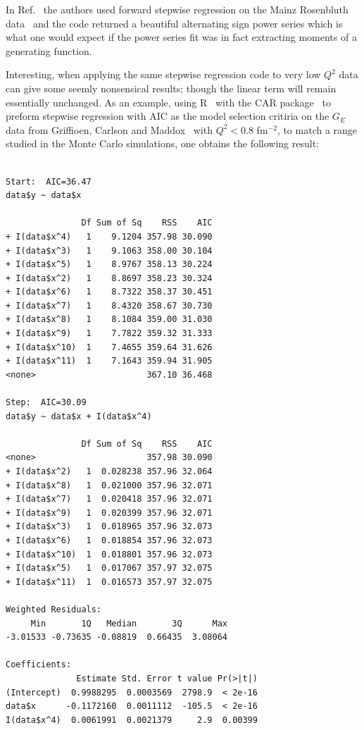 \documentclass[10pt,aps,prc,twocolumn]{revtex4-1}
\begin{document}
\begin{appendix}
In Ref.~\cite{Higinbotham:2015rja} the authors used forward stepwise regression on the Mainz
Rosenbluth data~\cite{Bernauer:2010wm} and the code returned a beautiful alternating sign power 
series which is what one would expect if the power series fit was in fact extracting moments
of a generating function.   

Interesting, when applying the same stepwise regression code to very low $Q^2$ data can give
some seemly nonsensical results; though the linear term will remain essentially unchanged.   
As an example, using R~\cite{R} with the CAR package~\cite{car} to preform stepwise regression with AIC as the
model selection critiria on the $G_E$ data from Griffioen, 
Carlson and Maddox~\cite{Griffioen:2015hta} with $Q^2 < 0.8$ fm$^{-2}$, to match a range studied
in the Monte Carlo simulations, one obtains the following result:

\begin{Verbatim}[fontsize=\footnotesize]

Start:  AIC=36.47
data$y ~ data$x

               Df Sum of Sq    RSS    AIC
+ I(data$x^4)   1    9.1204 357.98 30.090
+ I(data$x^3)   1    9.1063 358.00 30.104
+ I(data$x^5)   1    8.9767 358.13 30.224
+ I(data$x^2)   1    8.8697 358.23 30.324
+ I(data$x^6)   1    8.7322 358.37 30.451
+ I(data$x^7)   1    8.4320 358.67 30.730
+ I(data$x^8)   1    8.1084 359.00 31.030
+ I(data$x^9)   1    7.7822 359.32 31.333
+ I(data$x^10)  1    7.4655 359.64 31.626
+ I(data$x^11)  1    7.1643 359.94 31.905
<none>                      367.10 36.468

Step:  AIC=30.09
data$y ~ data$x + I(data$x^4)

               Df Sum of Sq    RSS    AIC
<none>                      357.98 30.090
+ I(data$x^2)   1  0.028238 357.96 32.064
+ I(data$x^8)   1  0.021000 357.96 32.071
+ I(data$x^7)   1  0.020418 357.96 32.071
+ I(data$x^9)   1  0.020399 357.96 32.071
+ I(data$x^3)   1  0.018965 357.96 32.073
+ I(data$x^6)   1  0.018854 357.96 32.073
+ I(data$x^10)  1  0.018801 357.96 32.073
+ I(data$x^5)   1  0.017067 357.97 32.075
+ I(data$x^11)  1  0.016573 357.97 32.075

Weighted Residuals:
     Min       1Q   Median       3Q      Max 
-3.01533 -0.73635 -0.08819  0.66435  3.08064 

Coefficients:
              Estimate Std. Error t value Pr(>|t|)    
(Intercept)  0.9988295  0.0003569  2798.9  < 2e-16 
data$x      -0.1172160  0.0011112  -105.5  < 2e-16 
I(data$x^4)  0.0061991  0.0021379     2.9  0.00399 


\end{Verbatim}
\end{appendix}
\end{document}
